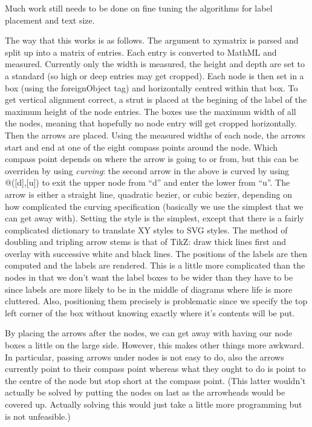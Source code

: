 \documentclass{webpage}
\begin{document}
Much work still needs to be done on fine tuning the algorithms for label placement and text size.

The way that this works is as follows.
The argument to xymatrix is parsed and split up into a matrix of entries.
Each entry is converted to MathML and measured.
Currently only the width is measured, the height and depth are set to a standard (so high or deep entries may get cropped).
Each node is then set in a box (using the foreignObject tag) and horizontally centred within that box.
To get vertical alignment correct, a strut is placed at the begining of the label of the maximum height of the node entries.
The boxes use the maximum width of all the nodes, meaning that hopefully no node entry will get cropped horizontally.
Then the arrows are placed.
Using the measured widths of each node, the arrows start and end at one of the eight compass points around the node.
Which compass point depends on where the arrow is going to or from, but this can be overriden by using \emph{curving}: the second arrow in the above is curved by using @([d],[u]) to exit the upper node from ``d'' and enter the lower from ``u''.
The arrow is either a straight line, quadratic bezier, or cubic bezier, depending on how complicated the curving specification (basically we use the simplest that we can get away with).
Setting the style is the simplest, except that there is a fairly complicated dictionary to translate XY styles to SVG styles.
The method of doubling and tripling arrow stems is that of TikZ: draw thick lines first and overlay with successive white and black lines.
The positions of the labels are then computed and the labels are rendered.
This is a little more complicated than the nodes in that we don't want the label boxes to be wider than they have to be since labels are more likely to be in the middle of diagrams where life is more cluttered.
Also, positioning them precisely is problematic since we specify the top left corner of the box without knowing exactly where it's contents will be put.

By placing the arrows after the nodes, we can get away with having our node boxes a little on the large side.
However, this makes other things more awkward.
In particular, passing arrows under nodes is not easy to do, also the arrows currently point to their compass point whereas what they ought to do is point to the centre of the node but stop short at the compass point.
(This latter wouldn't actually be solved by putting the nodes on last as the arrowheads would be covered up.
Actually solving this would just take a little more programming but is not unfeasible.)
\end{document}
